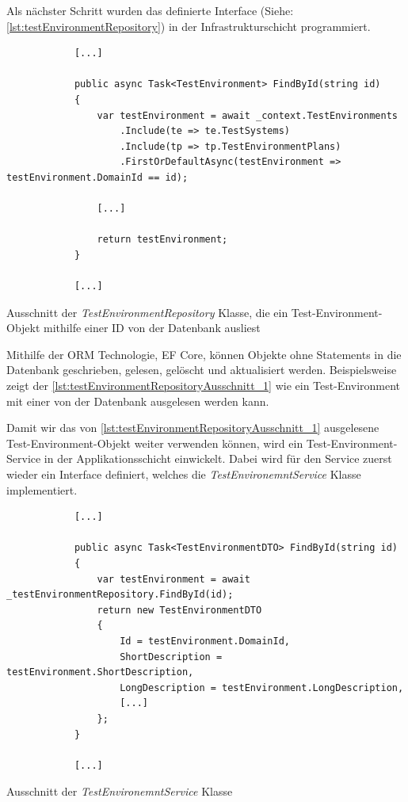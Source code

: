 \documentclass[a4paper, fontsize=11pt, parskip=half, twoside]{scrreprt}
\begin{document}
	Als nächster Schritt wurden das definierte Interface (Siehe: \autoref{lst:testEnvironmentRepository}) in der Infrastrukturschicht programmiert.
	
	\begin{listing}[ht]
		\begin{verbatim}
			[...]
			
			public async Task<TestEnvironment> FindById(string id)
			{
				var testEnvironment = await _context.TestEnvironments
					.Include(te => te.TestSystems)
					.Include(tp => tp.TestEnvironmentPlans)
					.FirstOrDefaultAsync(testEnvironment => testEnvironment.DomainId == id);
				
				[...]
				
				return testEnvironment;
			}
		
			[...]
		\end{verbatim}
		\caption{Ausschnitt der \emph{TestEnvironmentRepository} Klasse, die ein Test-Environment-Objekt mithilfe einer \ac{ID} von der Datenbank ausliest}
		\label{lst:testEnvironmentRepositoryAusschnitt_1}
	\end{listing}
	
	Mithilfe der \ac{ORM} Technologie, \ac{EF} Core, können Objekte ohne  Statements in die Datenbank geschrieben, gelesen, gelöscht und aktualisiert werden.
	Beispielsweise zeigt der \autoref{lst:testEnvironmentRepositoryAusschnitt_1} wie ein Test-Environment mit einer  von der Datenbank ausgelesen werden kann.
	
	Damit wir das von \autoref{lst:testEnvironmentRepositoryAusschnitt_1} ausgelesene Test-Environment-Objekt weiter verwenden können, wird ein Test-Environment-Service in der Applikationsschicht einwickelt.
	Dabei wird für den Service zuerst wieder ein Interface definiert, welches die \emph{TestEnvironemntService} Klasse implementiert.
	
	\begin{listing}[ht]
		\begin{verbatim}
			[...]
			
			public async Task<TestEnvironmentDTO> FindById(string id)
			{
				var testEnvironment = await _testEnvironmentRepository.FindById(id);	
				return new TestEnvironmentDTO
				{
					Id = testEnvironment.DomainId,
					ShortDescription = testEnvironment.ShortDescription,
					LongDescription = testEnvironment.LongDescription,
					[...]
				};
			}
			
			[...]
		\end{verbatim}
		\caption{Ausschnitt der \emph{TestEnvironemntService} Klasse}
		\label{lst:testEnvironmentServiceAusschnitt}
	\end{listing}
\end{document}
